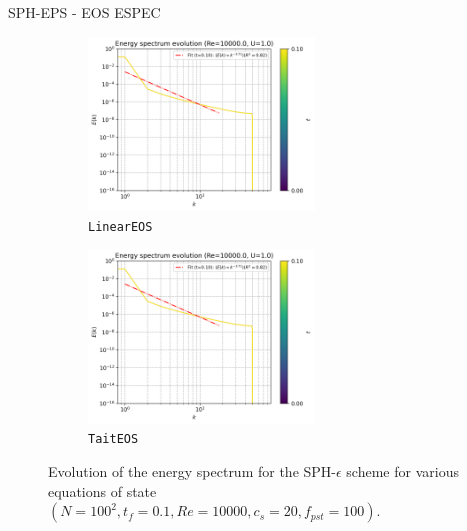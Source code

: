 SPH-EPS - EOS ESPEC 
\begin{figure}[H]
  \begin{subfigure}{7cm}
  \centering\includegraphics[width=6cm]{Code-Figures/mon2017/eos/c0_20_linear_pec_dtmul_1_nx_100_pst_10_re_10000_mon2017/energy_spectrum_evolution.png}
  \caption{\texttt{LinearEOS}}
  \end{subfigure}
  \begin{subfigure}{7cm}
  \centering\includegraphics[width=6cm]{Code-Figures/mon2017/eos/c0_20_tait_pec_dtmul_1_nx_100_pst_10_re_10000_mon2017/energy_spectrum_evolution.png}
  \caption{\texttt{TaitEOS}}
  \end{subfigure}
  \caption{Evolution of the energy spectrum for the SPH-$\epsilon$ scheme for various equations of state $(N=100^2, t_f=0.1, Re=10000, c_s=20, f_{pst}=100)$.}
  \label{fig:sph-eps-eos-espec}
\end{figure}


